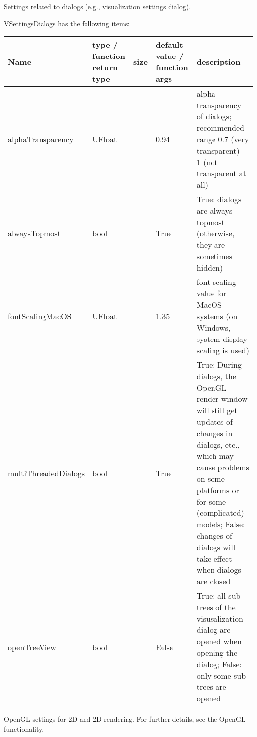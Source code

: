 
\label{sec:VSettingsDialogs}
Settings related to dialogs (e.g., visualization settings dialog).

\noindent VSettingsDialogs has the following items:
\begin{center}
  \footnotesize
  \begin{longtable}{| p{4.2cm} | p{2.5cm} | p{0.3cm} | p{3.0cm} | p{6cm} |}
    \hline
    \bf Name & \bf type / function return type & \bf size & \bf default value / function args & \bf description \\ \hline
    alphaTransparency &     UFloat &      &     0.94 &     alpha-transparency of dialogs; recommended range 0.7 (very transparent) - 1 (not transparent at all)\\ \hline
    alwaysTopmost &     bool &      &     True &     True: dialogs are always topmost (otherwise, they are sometimes hidden)\\ \hline
    fontScalingMacOS &     UFloat &      &     1.35 &     font scaling value for MacOS systems (on Windows, system display scaling is used)\\ \hline
    multiThreadedDialogs &     bool &      &     True &     True: During dialogs, the OpenGL render window will still get updates of changes in dialogs, etc., which may cause problems on some platforms or for some (complicated) models; False: changes of dialogs will take effect when dialogs are closed\\ \hline
    openTreeView &     bool &      &     False &     True: all sub-trees of the visusalization dialog are opened when opening the dialog; False: only some sub-trees are opened\\ \hline
	  \end{longtable}
	\end{center}



\label{sec:VSettingsOpenGL}
OpenGL settings for 2D and 2D rendering. For further details, see the OpenGL functionality. 

